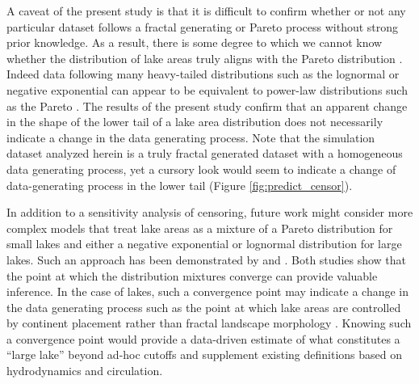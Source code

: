 \documentclass{article}
\begin{document}
A caveat of the present study is that it is difficult to confirm whether or not any particular dataset follows a fractal generating or Pareto process without strong prior knowledge. As a result, there is some degree to which we cannot know whether the distribution of lake areas truly aligns with the Pareto distribution \citep{seekell2011does}. Indeed data following many heavy-tailed distributions such as the lognormal or negative exponential can appear to be equivalent to power-law distributions such as the Pareto \citep{clausetPowerlawDistributionsEmpirical2009,seekell2011does}. The results of the present study confirm that an apparent change in the shape of the lower tail of a lake area distribution does not necessarily indicate a change in the data generating process. Note that the simulation dataset analyzed herein is a truly fractal generated dataset with a homogeneous data generating process, yet a cursory look would seem to indicate a change of data-generating process in the lower tail (Figure \ref{fig:predict_censor}).

In addition to a sensitivity analysis of censoring, future work might consider more complex models that treat lake areas as a mixture of a Pareto distribution for small lakes and either a negative exponential or lognormal distribution for large lakes. Such an approach has been demonstrated by \citep{bonabeau_scaling_1999-1} and \citep{scollnikCompositeLognormalParetoModels2007}. Both studies show that the point at which the distribution mixtures converge can provide valuable inference. In the case of lakes, such a convergence point may indicate a change in the data generating process such as the point at which lake areas are controlled by continent placement rather than fractal landscape morphology \citep{goodchildLakesFractalSurfaces1988,hamiltonEstimationFractalDimension1992}. Knowing such a convergence point would provide a data-driven estimate of what constitutes a “large lake” beyond ad-hoc cutoffs and supplement existing definitions based on hydrodynamics and circulation.








\end{document}
